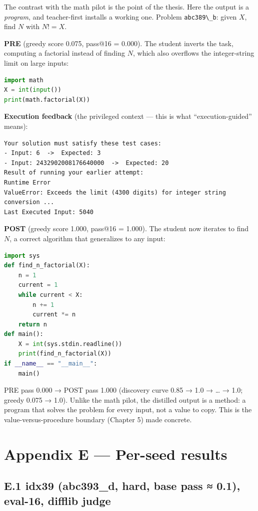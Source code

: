 The contrast with the math pilot is the point of the thesis. Here the output is a \emph{program}, and teacher-first installs a working one. Problem \passthrough{\lstinline!abc389\_b!}: given \(X\), find \(N\) with \(N! = X\).

\textbf{PRE} (greedy score 0.075, pass@16 = 0.000). The student inverts the task, computing a factorial instead of finding \(N\), which also overflows the integer-string limit on large inputs:

\begin{lstlisting}[language=Python]
import math
X = int(input())
print(math.factorial(X))
\end{lstlisting}

\textbf{Execution feedback} (the privileged context --- this is what ``execution-guided'' means):

\begin{lstlisting}
Your solution must satisfy these test cases:
- Input: 6  ->  Expected: 3
- Input: 2432902008176640000  ->  Expected: 20
Result of running your earlier attempt:
Runtime Error
ValueError: Exceeds the limit (4300 digits) for integer string conversion ...
Last Executed Input: 5040
\end{lstlisting}

\textbf{POST} (greedy score 1.000, pass@16 = 1.000). The student now iterates to find \(N\), a correct algorithm that generalizes to any input:

\begin{lstlisting}[language=Python]
import sys
def find_n_factorial(X):
    n = 1
    current = 1
    while current < X:
        n += 1
        current *= n
    return n
def main():
    X = int(sys.stdin.readline())
    print(find_n_factorial(X))
if __name__ == "__main__":
    main()
\end{lstlisting}

PRE pass 0.000 → POST pass 1.000 (discovery curve 0.85 → 1.0 → \ldots{} → 1.0; greedy 0.075 → 1.0). Unlike the math pilot, the distilled output is a method: a program that solves the problem for every input, not a value to copy. This is the value-versus-procedure boundary (Chapter 5) made concrete.

\section{Appendix E --- Per-seed results}\label{appendix-e-per-seed-results}

\subsection{E.1 idx39 (abc393\_d, hard, base pass ≈ 0.1), eval-16, difflib judge}\label{e.1-idx39-abc393_d-hard-base-pass-0.1-eval-16-difflib-judge}


